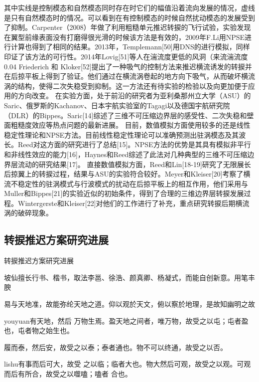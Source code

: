 其中实线是控制模态和自然模态同时存在时它们的幅值沿着流向发展的情况，虚线是只有自然模态时的情况。可以看到在有控制模态的时候自然扰动模态的发展受到了抑制。Carpenter（2008）年做了利用粗糙单元推迟转捩的飞行试验，实验发现在翼型前缘表面没有打磨得很光滑的时候该方法是有效的，2009年F.Li用NPSE进行计算也得到了相同的结果。2013年，Templemann[50]用DNS的进行模拟，同样印证了该方法的可行性。2014年Lovig[51]等人在湍流度更低的风洞（来流湍流度0.04%
Friederich 和 Kloker[52]提出了一种吸气的控制方法来推迟横流诱发的转捩并在后掠平板上得到了验证。他们通过在横流涡卷起的地方向下吸气，从而破坏横流涡的结构，使得二次失稳受到抑制。这一方法还有待实验的检验以及向更加便于应用的方向改变。
在实验方面，处于前沿的研究者为亚利桑那州立大学（ASU）的Saric、俄罗斯的Kachanov、日本宇航实验室的Tagagi以及德国宇航研究院（DLR）的Bippes。Saric[14]综述了三维不可压缩边界层的感受性、二次失稳和壁面粗糙度效应等热点问题的最新进展。
目前，数值模拟方面使用较多的还是线性稳定性理论和NPSE方法。目前线性稳定性理论可以准确预测出驻涡模态及其波长。Reed对这方面的研究进行了总结[15]。NPSE方法的优势是其具有模拟非平行和非线性效应的能力[16]，Haynes和Reed综述了此法对几种典型的三维不可压缩边界层流动的研究结果[17]。
直接数值模拟方面，Reed和Lin[18-19]研究了无限展长后掠翼上的转捩过程，结果与ASU的实验符合较好。Meyer和Kleiser[20]考察了横流不稳定性的驻涡模式与行波模式的扰动在后掠平板上的相互作用，他们采用与Muller和Bippes[21]的实验近似的初始条件，得到了合理的三维边界层转捩发展过程。Wintergerste和Kleiser[22]对他们的工作进行了补充，重点研究转捩后期横流涡的破碎现象。

\subsection{转捩推迟方案研究进展}
转捩推迟方案研究进展

{\kaishu 坡仙擅长行书、楷书，取法李邕、徐浩、颜真卿、杨凝式，而能自创新意。用笔丰腴}

{\fangsong 易与天地准，故能弥纶天地之道。仰以观於天文，俯以察於地理，是故知幽明之故}

{\ifcsname youyuan\endcsname\youyuan\else[无 \cs{youyuan} 字体。]\fi 有天地，然后
  万物生焉。盈天地之间者，唯万物，故受之以屯；屯者盈也，屯者物之始生也。}

{\heiti 履而泰，然后安，故受之以泰；泰者通也。物不可以终通，故受之以否。}

{\ifcsname lishu\endcsname\lishu\else[无 \cs{lishu} 字体。]\fi 有事而后可大，故受
  之以临；临者大也。物大然后可观，故受之以观。可观而后有所合，故受之以噬嗑；嗑者
  合也。}

